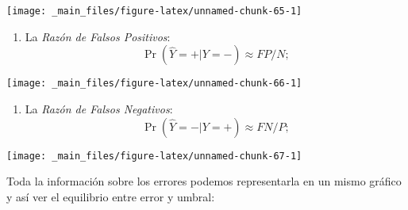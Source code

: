 \documentclass[]{book}
\newenvironment{Shaded}{\begin{snugshade}}{\end{snugshade}}
\newcommand{\KeywordTok}[1]{\textcolor[rgb]{0.13,0.29,0.53}{\textbf{#1}}}
\newcommand{\NormalTok}[1]{#1}
\newcommand{\OperatorTok}[1]{\textcolor[rgb]{0.81,0.36,0.00}{\textbf{#1}}}
\newcommand{\StringTok}[1]{\textcolor[rgb]{0.31,0.60,0.02}{#1}}
\providecommand{\tightlist}{%
  \setlength{\itemsep}{0pt}\setlength{\parskip}{0pt}}
\begin{document}
\begin{center}\texttt{[image: \_main\_files/figure-latex/unnamed-chunk-65-1]} \end{center}

\begin{enumerate}
\def\labelenumi{\arabic{enumi}.}
\setcounter{enumi}{2}
\tightlist
\item
  La \emph{Razón de Falsos Positivos}: \[ \Pr(\hat Y = + | Y = -) \approx FP/N;\]
\end{enumerate}

\begin{Shaded}
\end{Shaded}

\begin{center}\texttt{[image: \_main\_files/figure-latex/unnamed-chunk-66-1]} \end{center}

\begin{enumerate}
\def\labelenumi{\arabic{enumi}.}
\setcounter{enumi}{3}
\tightlist
\item
  La \emph{Razón de Falsos Negativos}: \[ \Pr(\hat Y = - | Y = +) \approx FN/P;\]
\end{enumerate}

\begin{Shaded}
\end{Shaded}

\begin{center}\texttt{[image: \_main\_files/figure-latex/unnamed-chunk-67-1]} \end{center}

Toda la información sobre los errores podemos representarla en un mismo gráfico y así ver el equilibrio entre error y umbral:
\end{document}
